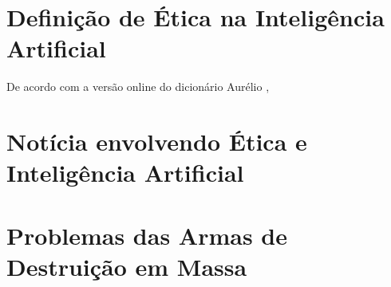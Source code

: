 \documentclass{article}
\begin{document}
\section*{Definição de Ética na Inteligência Artificial}
De acordo com a versão online do dicionário Aurélio \cite{aurelio_online}, 

\section*{Notícia envolvendo Ética e Inteligência Artificial}


\section*{Problemas das Armas de Destruição em Massa}


\end{document}
